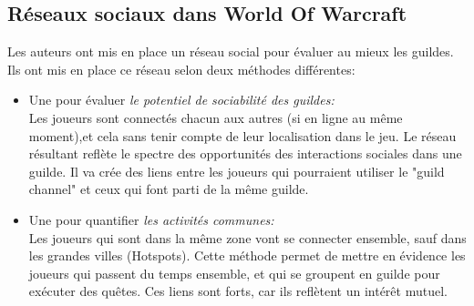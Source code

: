 \documentclass[11pt,a4paper]{article}
\begin{document}
\subsection{Réseaux sociaux dans World Of Warcraft} 
Les auteurs ont mis en place un réseau social pour évaluer au mieux les guildes. Ils ont mis en place ce réseau selon deux méthodes différentes:
\begin{itemize}
	\renewcommand{\labelitemi}{$\bullet$}
	\item Une pour évaluer \textit{le potentiel de sociabilité des guildes:}\\
	Les joueurs sont connectés chacun aux autres (si en ligne au même moment),et cela sans tenir compte de leur localisation dans le jeu. Le réseau résultant reflète le spectre des opportunités des interactions sociales dans une guilde. Il va crée des liens entre les joueurs qui pourraient utiliser le "guild channel" et ceux qui font parti de la même guilde.
	\item Une pour quantifier \textit{les activités communes:}\\
	Les joueurs qui sont dans la même zone vont se connecter ensemble, sauf dans les grandes villes (Hotspots). Cette méthode permet de mettre en évidence les joueurs qui passent du temps ensemble, et qui se groupent en guilde pour exécuter des quêtes. Ces liens sont forts, car ils reflètent un intérêt mutuel. 
\end{itemize}
\end{document}
